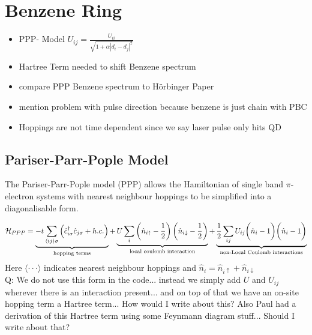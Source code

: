 \section{Benzene Ring}

\begin{itemize}
    \item PPP- Model $U_{ij} = \frac{U_{ii}}{\sqrt{1+\alpha |d_i - d_j|^2}}$
    \item Hartree Term needed to shift Benzene spectrum
    \item compare PPP Benzene spectrum to Hörbinger Paper
    \item mention problem with pulse direction because benzene is just chain with PBC
    \item Hoppings are not time dependent since we say laser pulse only hits QD
\end{itemize}



\subsection{Pariser-Parr-Pople Model}
The Pariser-Parr-Pople model (PPP) allows the Hamiltonian of single band $\pi$- electron systems with nearest neighbour hoppings to be simplified into a diagonalisable form.

\begin{equation}
    \mathcal{H}_{PPP} = \underbrace{-t \sum_{\langle ij \rangle \sigma} \left(\hat{c}^\dagger_{i\sigma}\hat{c}_{j\sigma} + h.c.\right) 
    }_{\text{hopping terms}}
    + \underbrace{U \sum_i \left(\hat{n}_{i\uparrow} - \frac{1}{2}\right)\left(\hat{n}_{i\downarrow} - {1\over 2}\right)
    }_{\text{local coulomb interaction}}
    + \underbrace{\frac{1}{2}\sum_{ij} U_{ij} \bigg(\hat{n}_{i} - 1\bigg)\bigg(\hat{n}_{i} - 1\bigg)
    }_{\text{non-Local Coulomb interactions}}
\end{equation}
Here $\langle \cdot\cdot\cdot \rangle$ indicates nearest neighbour hoppings and $\hat{n}_i = \hat{n}_{i\uparrow} + \hat{n}_{i\downarrow}$
\\

{\color{red} Q: We do not use this form in the code... instead we simply add $U$ and $U_{ij}$ wherever there is an interaction present... and on top of that we have an on-site hopping term a Hartree term... How would I write about this? Also Paul had a derivation of this Hartree term using some Feynmann diagram stuff... Should I write about that?}
\\

